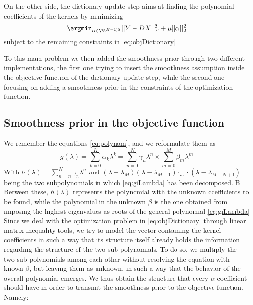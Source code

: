 On the other side, the dictionary update step aims at finding the polynomial coefficients of the kernels by minimizing
\begin{equation}
\argmin_{\alpha \in \R^{(K+1)S}} ||Y - DX||^2_F + \mu||\alpha||_2^2
\end{equation}
subject to the remaining constraints in \autoref{eq:objDictionary}

To this main problem we then added the smoothness prior through two different implementations, the first one trying to insert the smoothness assumption inside the objective function of the dictionary update step, while the second one focusing on adding a smoothness prior in the constraints of the optimization function.

\subsection{Smoothness prior in the objective function}
We remember the equations \ref{eq:polynom}, and we reformulate them as
\begin{equation}
g(\lambda) = \sum_{k=0}^K\alpha_k \lambda^k = \sum_{n=0}^N\gamma_n \lambda^n \times \sum_{m=0}^M \beta_m \lambda^m
\label{eq:giLambda}
\end{equation}
With $h(\lambda) = \sum_{n=n}^N \gamma_n \lambda^n$ and $(\lambda - \lambda_M)(\lambda - \lambda_{M-1})\cdot_{\dots}\cdot (\lambda - \lambda_{M - N +1})$ being the two subpolynomials in which \ref{eq:giLambda} has been decomposed. B Between these, $h(\lambda)$ represents the polynomial with the unknown coefficients to be found, while the polynomial in the unknown $\beta$ is the one obtained from imposing the highest eigenvalues as roots of the general polynomial \ref{eq:giLambda}  Since we deal with the optimization problem in \autoref{eq:objDictionary} through linear matrix inequality tools, we try to model the vector containing the kernel coefficients in such a way that its structure itself already holds the information regarding the structure of the two sub polynomials. To do so, we multiply the two sub polynomials among each other without resolving the equation with known $\beta$, but leaving them as unknown, in such a way that the behavior of the overall polynomial emerges. We thus obtain the structure that every $\alpha$ coefficient should have in order to transmit the smoothness prior to the objective function. Namely:
